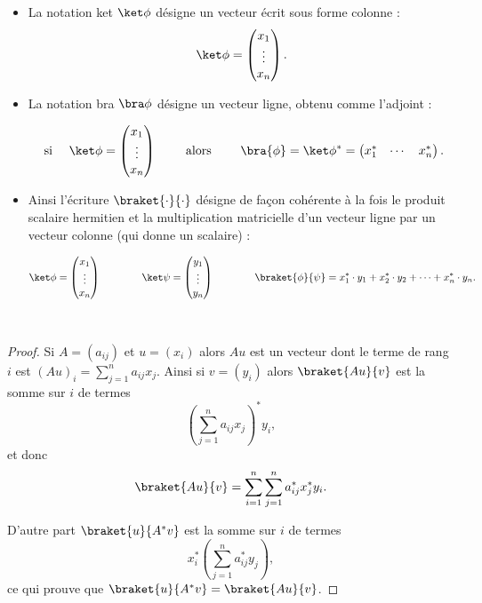 \documentclass[11pt,class=report,crop=false]{standalone}
\begin{document}
\begin{itemize}
  \item La notation \og{}ket\fg{} $\ket\phi$ désigne un vecteur écrit sous forme colonne :
$$\ket\phi = \begin{pmatrix}x_1 \\ \vdots \\ x_{n} \end{pmatrix}.$$

  \item La notation \og{}bra\fg{} $\bra\phi$ désigne un vecteur ligne, obtenu comme l'adjoint :

$$
\text{ si }\quad\ket\phi = \begin{pmatrix}x_1 \\ \vdots \\ x_{n} \end{pmatrix}
\qquad\text{ alors }\qquad
\bra{\phi} = \ket\phi^* = \begin{pmatrix}x_1^*& \cdots &x_{n}^*\end{pmatrix}.$$

  \item Ainsi l'écriture $\braket{\cdot}{\cdot}$ désigne de façon cohérente à la fois le produit scalaire hermitien et la multiplication matricielle d'un vecteur ligne par un vecteur colonne (qui donne un scalaire) :

$$\ket\phi = \begin{pmatrix}x_1 \\ \vdots \\ x_{n} \end{pmatrix}
\qquad\qquad
\ket\psi = \begin{pmatrix}y_1 \\ \vdots \\ y_{n} \end{pmatrix}
\qquad\qquad
\braket{\phi}{\psi} = x_1^* \cdot y_1 + x_2^* \cdot y_2 + \cdots + x_n^* \cdot y_n.$$
\end{itemize}



\begin{proposition}
~
\end{proposition}

\begin{proof}
Si $A = (a_{ij})$ et $u=(x_i)$ alors $Au$ est un vecteur dont le terme de rang $i$ est $(Au)_i = \sum_{j=1}^n a_{ij}x_j$.
Ainsi si $v=(y_i)$ alors $\braket{Au}{v}$ est la somme sur $i$ de termes 
$$\left( \sum_{j=1}^n a_{ij} x_j \right)^* y_i,$$
et donc 
$$\braket{Au}{v}
= \sum_{i=1}^n \sum_{j=1}^n a_{ij}^* x_j^*  y_i.$$

D'autre part $\braket{u}{A^*v}$ est la somme sur $i$ de termes 
$$x_i^* \left( \sum_{j=1}^n a_{ij}^* y_j \right),$$
ce qui prouve que $\braket{u}{A^*v} = \braket{Au}{v}$. 
\end{proof}
\end{document}
